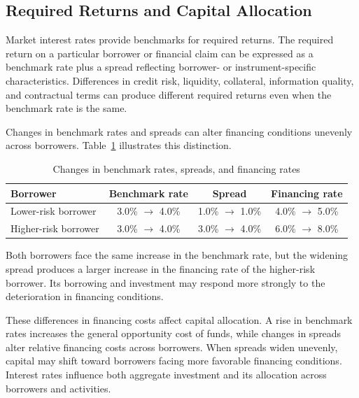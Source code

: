 \subsection{Required Returns and Capital Allocation}

Market interest rates provide benchmarks for required returns. The required return on a particular borrower or financial claim can be expressed as a benchmark rate plus a spread reflecting borrower- or instrument-specific characteristics. Differences in credit risk, liquidity, collateral, information quality, and contractual terms can produce different required returns even when the benchmark rate is the same.

Changes in benchmark rates and spreads can alter financing conditions unevenly across borrowers. Table~\ref{tab:ch6-borrower-financing-rates} illustrates this distinction.

\begin{table}[H]

\centering

\caption{Changes in benchmark rates, spreads, and financing rates}

\label{tab:ch6-borrower-financing-rates}

\begin{tabular}{@{}lccc@{}}

\toprule

\textbf{Borrower} &
\textbf{Benchmark rate} &
\textbf{Spread} &
\textbf{Financing rate} \\

\midrule

Lower-risk borrower
& 3.0\% $\rightarrow$ 4.0\%
& 1.0\% $\rightarrow$ 1.0\%
& 4.0\% $\rightarrow$ 5.0\% \\

Higher-risk borrower
& 3.0\% $\rightarrow$ 4.0\%
& 3.0\% $\rightarrow$ 4.0\%
& 6.0\% $\rightarrow$ 8.0\% \\

\bottomrule

\end{tabular}

\end{table}

Both borrowers face the same increase in the benchmark rate, but the widening spread produces a larger increase in the financing rate of the higher-risk borrower. Its borrowing and investment may respond more strongly to the deterioration in financing conditions.

These differences in financing costs affect capital allocation. A rise in benchmark rates increases the general opportunity cost of funds, while changes in spreads alter relative financing costs across borrowers. When spreads widen unevenly, capital may shift toward borrowers facing more favorable financing conditions. Interest rates influence both aggregate investment and its allocation across borrowers and activities.

